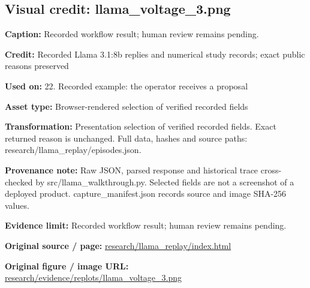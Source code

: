 \documentclass[10pt,letterpaper]{article}
\begin{document}
\subsection*{Visual credit: llama\_voltage\_3.png}
\textbf{Caption:} Recorded workflow result; human review remains pending.\par
\textbf{Credit:} Recorded Llama 3.1:8b replies and numerical study records; exact public reasons preserved\par
\textbf{Used on:} 22. Recorded example: the operator receives a proposal\par
\textbf{Asset type:} Browser-rendered selection of verified recorded fields\par
\textbf{Transformation:} Presentation selection of verified recorded fields. Exact returned reason is unchanged. Full data, hashes and source paths: research/llama\_replay/episodes.json.\par
\textbf{Provenance note:} Raw JSON, parsed response and historical trace cross-checked by src/llama\_walkthrough.py. Selected fields are not a screenshot of a deployed product. capture\_manifest.json records source and image SHA-256 values.\par
\textbf{Evidence limit:} Recorded workflow result; human review remains pending.\par
\textbf{Original source / page:} \href{../research/llama_replay/index.html}{\small\ttfamily research/\allowbreak{}llama\_\allowbreak{}replay/\allowbreak{}index.\allowbreak{}html}\par
\textbf{Original figure / image URL:} \href{../research/evidence/replots/llama_voltage_3.png}{\small\ttfamily research/\allowbreak{}evidence/\allowbreak{}replots/\allowbreak{}llama\_\allowbreak{}voltage\_\allowbreak{}3.\allowbreak{}png}\par
\par\medskip
\end{document}
